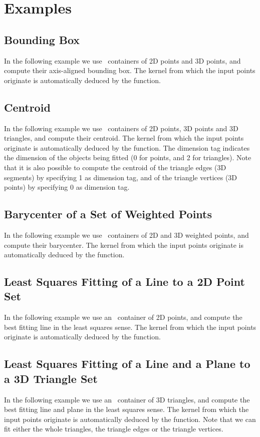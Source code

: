\section{Examples\label{subsec:pca_examples}}

\subsection{Bounding Box}
In the following example we use \stl\ containers of 2D points and 3D points, and compute their axis-aligned bounding box. The kernel from which the input points originate is automatically deduced by the function.

\subsection{Centroid}
In the following example we use \stl\ containers of 2D points, 3D points and 3D triangles, and compute their centroid. The kernel from which the input points originate is automatically deduced by the function. The dimension tag indicates the dimension of the objects being fitted (0 for points, and 2 for triangles). Note that it is also possible to compute the centroid of the triangle edges (3D segments) by specifying 1 as dimension tag, and of the triangle vertices (3D points) by specifying 0 as dimension tag.

\subsection{Barycenter of a Set of Weighted Points}
In the following example we use \stl\ containers of 2D and 3D weighted points, and compute their barycenter. The kernel from which the input points originate is automatically deduced by the function.

\subsection{Least Squares Fitting of a Line to a 2D Point Set}
In the following example we use an \stl\ container of 2D points, and compute the best fitting line in the least squares sense. The kernel from which the input points originate is automatically deduced by the function.

\subsection{Least Squares Fitting of a Line and a Plane to a 3D Triangle Set}
In the following example we use an \stl\ container of 3D triangles, and compute the best fitting line and plane in the least squares sense. The kernel from which the input points originate is automatically deduced by the function. Note that we can fit either the whole triangles, the triangle edges or the triangle vertices.

